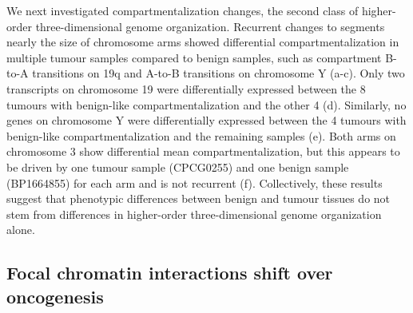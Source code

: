 We next investigated compartmentalization changes, the second class of higher-order three-dimensional genome organization.
Recurrent changes to segments nearly the size of chromosome arms showed differential compartmentalization in multiple tumour samples compared to benign samples, such as compartment B-to-A transitions on 19q and A-to-B transitions on chromosome Y (a-c).
Only two transcripts on chromosome 19 were differentially expressed between the 8 tumours with benign-like compartmentalization and the other 4 (d).
Similarly, no genes on chromosome Y were differentially expressed between the 4 tumours with benign-like compartmentalization and the remaining samples (e).
Both arms on chromosome 3 show differential mean compartmentalization, but this appears to be driven by one tumour sample (CPCG0255) and one benign sample (BP1664855) for each arm and is not recurrent (f).
Collectively, these results suggest that phenotypic differences between benign and tumour tissues do not stem from differences in higher-order three-dimensional genome organization alone.

\subsection{Focal chromatin interactions shift over oncogenesis}

